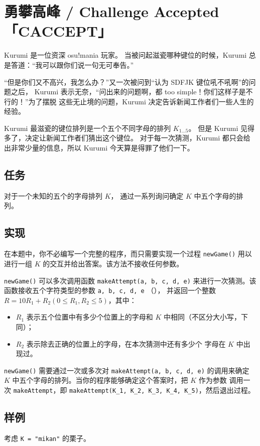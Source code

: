 \documentclass[UTF8, 11pt, a4paper]{article}
\begin{document}
\section*{勇攀高峰 / Challenge Accepted \makebox[2.5em]{} \small{「CACCEPT」}}

Kurumi 是一位资深 osu!mania 玩家。%
当被问起滋瓷哪种键位的时候，Kurumi 总是答道：“我可以跟你们说一句无可奉告。”%

“但是你们又不高兴，我怎么办？”又一次被问到“认为 SDFJK 键位吼不吼啊”的问题之后，%
Kurumi 表示无奈，“问出来的问题啊，都 too simple！你们这样子是不行的！”为了摆脱%
这些无止境的问题，Kurumi 决定告诉新闻工作者们一些人生的经验。

Kurumi 最滋瓷的键位排列是一个五个不同字母的排列 $K_{1 \dots 5}$。%
但是 Kurumi 见得多了，决定让新闻工作者们猜出这个键位。%
对于每一次猜测，Kurumi 都只会给出非常少量的信息，所以 Kurumi 今天算是得罪了他们一下。

\subsection*{任务}
对于一个未知的五个的字母排列 $K$，%
通过一系列询问确定 $K$ 中五个字母的排列。

\subsection*{实现}
在本题中，你不必编写一个完整的程序，而只需要实现一个过程 \texttt{newGame()}%
用以进行一组 $K$ 的交互并给出答案。该方法不接收任何参数。

\texttt{newGame()} 可以多次调用函数 \texttt{makeAttempt(a, b, c, d, e)}%
来进行一次猜测。该函数接收五个字符类型的参数 \texttt{a, b, c, d, e}%
（），%
并返回一个整数 $R = 10 R_1 + R_2 (0 \leq R_1, R_2 \leq 5)$，其中：
\begin{itemize}
    \item $R_1$ 表示五个位置中有多少个位置上的字母和 $K$ 中相同（不区分大小写，下同）；
    \item $R_2$ 表示除去正确的位置上的字母，在本次猜测中还有多少个%
        字母在 $K$ 中出现过。
\end{itemize}

\texttt{newGame()} 需要通过一次或多次对 \texttt{makeAttempt(a, b, c, d, e)}%
的调用来确定 $K$ 中五个字母的排列。当你的程序能够确定这个答案时，把 $K$ 作为参数%
调用一次 \texttt{makeAttempt}，即 \texttt{makeAttempt(K\_1, K\_2, K\_3, K\_4, K\_5)}，然后退出过程。

\subsection*{样例}
考虑 \texttt{K = "mikan"} 的栗子。
\end{document}
